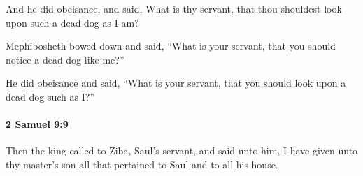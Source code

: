 			\begin{versebox}
					\item[BHS] 
					\item[ASV] And he did obeisance, and said, What is thy servant, that thou shouldest look upon such a dead dog as I am?
					\item[NIV] Mephibosheth bowed down and said, “What is your servant, that you should notice a dead dog like me?”
					\item[NRSV] He did obeisance and said, “What is your servant, that you should look upon a dead dog such as I?”
			\end{versebox}

		\paragraph{2 Samuel 9:9} %
			\label{2SAMUEL-9-9}

			Then the king called to Ziba, Saul’s servant, and said unto him, I have given unto thy master’s son all that pertained to Saul and to all his house.

